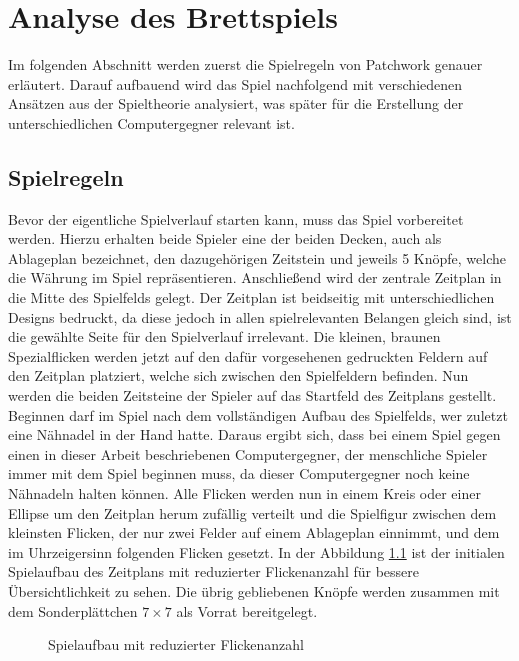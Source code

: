 \chapter{Analyse des Brettspiels}
\label{chapter:analyse-des-bretspiels}

Im folgenden Abschnitt werden zuerst die Spielregeln von Patchwork genauer erläutert. Darauf aufbauend wird das Spiel nachfolgend mit verschiedenen Ansätzen aus der Spieltheorie analysiert, was später für die Erstellung der unterschiedlichen Computergegner relevant ist.

\section{Spielregeln}
\label{section:spielregeln}

Bevor der eigentliche Spielverlauf starten kann, muss das Spiel vorbereitet werden. Hierzu erhalten beide Spieler eine der beiden Decken, auch als Ablageplan bezeichnet, den dazugehörigen Zeitstein und jeweils 5 Knöpfe, welche die Währung im Spiel repräsentieren. Anschließend wird der zentrale Zeitplan in die Mitte des Spielfelds gelegt. Der Zeitplan ist beidseitig mit unterschiedlichen Designs bedruckt, da diese jedoch in allen spielrelevanten Belangen gleich sind, ist die gewählte Seite für den Spielverlauf irrelevant. Die kleinen, braunen Spezialflicken werden jetzt auf den dafür vorgesehenen gedruckten Feldern auf den Zeitplan platziert, welche sich zwischen den Spielfeldern befinden. Nun werden die beiden Zeitsteine der Spieler auf das Startfeld des Zeitplans gestellt. Beginnen darf im Spiel nach dem vollständigen Aufbau des Spielfelds, wer zuletzt eine Nähnadel in der Hand hatte. Daraus ergibt sich, dass bei einem Spiel gegen einen in dieser Arbeit beschriebenen Computergegner, der menschliche Spieler immer mit dem Spiel beginnen muss, da dieser Computergegner noch keine Nähnadeln halten können. Alle Flicken werden nun in einem Kreis oder einer Ellipse um den Zeitplan herum zufällig verteilt und die Spielfigur zwischen dem kleinsten Flicken, der nur zwei Felder auf einem Ablageplan einnimmt, und dem im Uhrzeigersinn folgenden Flicken gesetzt. In der Abbildung \ref{fig:spielaufbau} ist der initialen Spielaufbau des Zeitplans mit reduzierter Flickenanzahl für bessere Übersichtlichkeit zu sehen. Die übrig gebliebenen Knöpfe werden zusammen mit dem Sonderplättchen $7\times7$ als Vorrat bereitgelegt. \cite{2014.PatchworkSpielanleitung}

\pagebreak

\begin{figure}[!ht]
    \centering
    \caption{Spielaufbau mit reduzierter Flickenanzahl}
    \label{fig:spielaufbau}
\end{figure}

